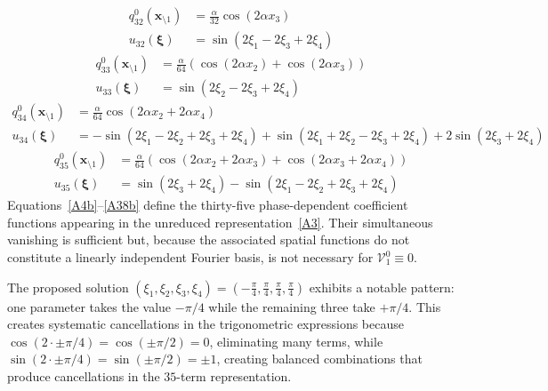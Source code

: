 \documentclass[11pt]{jfm}
\numberwithin{equation}{section}
\begin{document}
\vspace{-0.4cm}
\begin{subequations}
\label{A35}
\begin{align}
q_{32}^0(\boldsymbol{x}_{\setminus 1})&=\frac{\alpha}{32}   \cos (2 \alpha  x_3)
\label{A35a} \\
u_{32}(\boldsymbol{\xi})&=\sin (2 \xi_1-2 \xi_3+2 \xi_4)
\label{A35b}
\end{align}\end{subequations}
\vspace{-0.4cm}
\begin{subequations}
\label{A36}
\begin{align}
q_{33}^0(\boldsymbol{x}_{\setminus 1})&=\frac{\alpha}{64}   (\cos (2 \alpha  x_2)+\cos (2 \alpha  x_3))
\label{A36a} \\
u_{33}(\boldsymbol{\xi})&=\sin (2 \xi_2-2 \xi_3+2 \xi_4)
\label{A36b}
\end{align}\end{subequations}
\vspace{-0.4cm}
\begin{subequations}
\label{A37}
\begin{align}
q_{34}^0(\boldsymbol{x}_{\setminus 1})&=\frac{\alpha}{64}   \cos (2 \alpha  x_2+2 \alpha  x_4)\label{A37a} \\
u_{34}(\boldsymbol{\xi})&=-\sin (2 \xi_1-2 \xi_2+2 \xi_3+2 \xi_4)+\sin (2 \xi_1+2 \xi_2-2 \xi_3+2 \xi_4)+2 \sin (2 \xi_3+2 \xi_4)
\label{A37b}
\end{align}\end{subequations}
\vspace{-0.4cm}
\begin{subequations}
\label{A38}
\begin{align}
q_{35}^0(\boldsymbol{x}_{\setminus 1})&=\frac{\alpha}{64} (\cos (2 \alpha x_2+2 \alpha x_3)+\cos (2 \alpha x_3+2 \alpha x_4))\label{A38a} \\
u_{35}(\boldsymbol{\xi})&=\sin (2 \xi_3+2 \xi_4)-\sin (2 \xi_1-2 \xi_2+2 \xi_3+2 \xi_4)
\label{A38b}
\end{align}\end{subequations}
Equations~\eqref{A4b}--\eqref{A38b} define the thirty-five phase-dependent coefficient functions
appearing in the unreduced representation~\eqref{A3}. Their simultaneous vanishing is sufficient
but, because the associated spatial functions do not constitute a linearly independent Fourier
basis, is not necessary for $\mathcal{V}_1^0\equiv0$.

The proposed solution $(\xi_1, \xi_2, \xi_3, \xi_4) = (-\frac{\pi}{4}, \frac{\pi}{4}, \frac{\pi}{4}, \frac{\pi}{4})$ exhibits a notable pattern: one parameter takes the value $-\pi/4$ while the remaining three take $+\pi/4$. This creates systematic cancellations in the trigonometric expressions because $\cos(2 \cdot \pm\pi/4) = \cos(\pm\pi/2) = 0$, eliminating many terms, while $\sin(2 \cdot \pm\pi/4) = \sin(\pm\pi/2) = \pm 1$, creating balanced combinations that produce cancellations in the $35$-term representation.
\end{document}
